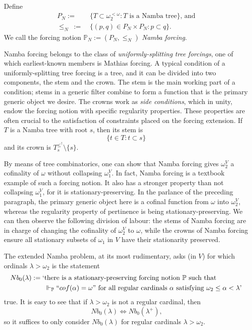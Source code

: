\documentclass[12pt]{article}
\numberwithin{equation}{section}
\begin{document}
\begin{defi}[Namba]
Define
\begin{align*}
    P_N := \ & \{T \subset \omega_2^{< \omega} : T \text{ is a Namba tree}\} \text{, and} \\
    \leq_N \ := \ & \{(p, q) \in P_N \times P_N : p \subset q\}.
\end{align*}
We call the forcing notion $\mathbb{P}_N := (P_N, \leq_N)$ \emph{Namba forcing}.
\end{defi}

Namba forcing belongs to the class of \emph{uniformly-splitting tree forcings}, one of which earliest-known members is Mathias forcing. A typical condition of a uniformly-splitting tree forcing is a tree, and it can be divided into two components, the stem and the crown. The stem is the main working part of a condition; stems in a generic filter combine to form a function that is the primary generic object we desire. The crowns work as \emph{side conditions}, which in unity, endow the forcing notion with specific regularity properties. These properties are often crucial to the satisfaction of constraints placed on the forcing extension. If $T$ is a Namba tree with root $s$, then its stem is $$\{t \in T : t \subset s\}$$ and its crown is $T_s^{\leq^{\dagger}} \setminus \{s\}$.

By means of tree combinatorics, one can show that Namba forcing gives $\omega_2^V$ a cofinality of $\omega$ without collapsing $\omega_1^V$. In fact, Namba forcing is a textbook example of such a forcing notion. It also has a stronger property than not collapsing $\omega_1^V$, for it is stationary-preserving. In the parlance of the preceding paragraph, the primary generic object here is a cofinal function from $\omega$ into $\omega_2^V$, whereas the regularity property of pertinence is being stationary-preserving. We can then observe the following division of labour: the stems of Namba forcing are in charge of changing the cofinality of $\omega_2^V$ to $\omega$, while the crowns of Namba forcing ensure all stationary subsets of $\omega_1$ in $V$ have their stationarity preserved.

The extended Namba problem, at its most rudimentary, asks (in $V$) for which ordinals $\lambda > \omega_2$ is the statement
\begin{align*}
    Nb_0(\lambda) := \text{`} & \text{there is a stationary-preserving forcing notion } \mathbb{P} \text{ such that} \\ 
    & \Vdash_{\mathbb{P}} ``cof(\alpha) = \omega" \text{ for all regular cardinals } \alpha \text{ satisfying } \omega_2 \leq \alpha < \lambda \text{'}
\end{align*} 
true. It is easy to see that if $\lambda > \omega_2$ is not a regular cardinal, then 
\begin{equation*}
    Nb_0(\lambda) \iff Nb_0(\lambda^+) \text{,}
\end{equation*}
so it suffices to only consider $Nb_0(\lambda)$ for regular cardinals $\lambda > \omega_2$.
\end{document}
